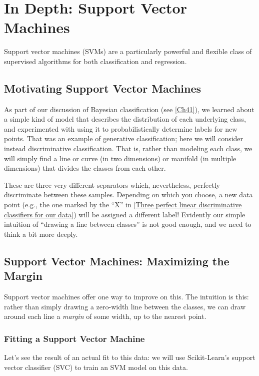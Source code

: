\chapter{In Depth: Support Vector Machines\label{Ch43}}
Support vector machines (SVMs) are a particularly powerful and flexible class of
supervised algorithms for both classification and regression.
\section{Motivating Support Vector Machines}
As part of our discussion of Bayesian classification (see \autoref{Ch41}), we learned about a simple kind of model that describes the distribution of each underlying class, and experimented with using it to probabilistically determine labels for new points. That was an example of generative classification; here we will consider instead discriminative classification. That is, rather than modeling each class, we will simply find a line or curve (in two dimensions) or manifold (in multiple dimensions) that divides the classes from each other.


These are three very different separators which, nevertheless, perfectly discriminate between these samples. Depending on which you choose, a new data point (e.g., the one marked by the “X” in \autoref{Three perfect linear discriminative classifiers for our data}) will be assigned a different label! Evidently our simple intuition of “drawing a line between classes” is not good enough, and we need to think a bit more deeply.
\section{Support Vector Machines: Maximizing the Margin}
Support vector machines offer one way to improve on this. The intuition is this: rather than simply drawing a zero-width line between the classes, we can draw around each line a \textit{margin} of some width, up to the nearest point. 

\subsection*{Fitting a Support Vector Machine}
Let’s see the result of an actual fit to this data: we will use Scikit-Learn’s support vector classifier (SVC) to train an SVM model on this data.

